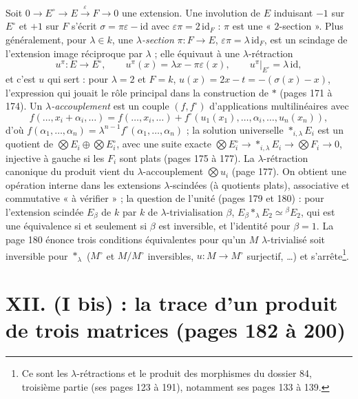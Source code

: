 \documentclass[11pt,a4paper]{article}
\begin{document}
Soit $0 \to E^{\circ} \to E \xrightarrow{\varepsilon} F \to 0$ une extension. Une
involution de $E$ induisant $-1$ sur $E^{\circ}$ et $+1$ sur $F$ s'écrit $\sigma
= \pi\varepsilon - \mathrm{id}$ avec $\varepsilon\pi = 2\,\mathrm{id}_F$ : $\pi$ est
une « $2$-section ». Plus généralement, pour $\lambda \in k$, une
\emph{$\lambda$-section} $\pi : F \to E$, $\varepsilon\pi = \lambda\,\mathrm{id}_F$,
est un scindage de l'extension image réciproque par $\lambda$ ; elle équivaut à
une $\lambda$-rétraction
\[
  u^{\pi} : E \to E^{\circ},\qquad u^{\pi}(x) = \lambda x - \pi\varepsilon(x),
  \qquad u^{\pi}|_{E^{\circ}} = \lambda\,\mathrm{id},
\]
et c'est $u$ qui sert : pour $\lambda = 2$ et $F = k$, $u(x) = 2x - t = -(\sigma(x)
- x)$, l'expression qui jouait le rôle principal dans la construction de $*$
(pages 171 à 174). Un \emph{$\lambda$-accouplement} est un couple $(f, f^{\circ})$
d'applications multilinéaires avec
\[
  f(\ldots, x_i + \alpha_i, \ldots) = f(\ldots, x_i, \ldots) + f^{\circ}(u_1(x_1),
  \ldots, \alpha_i, \ldots, u_n(x_n)),
\]
d'où $f(\alpha_1, \ldots, \alpha_n) = \lambda^{n-1}f^{\circ}(\alpha_1, \ldots,
\alpha_n)$ ; la solution universelle $\mathop{*}_{i, \lambda} E_i$ est un quotient de
$\bigotimes E_i \oplus \bigotimes E_i^{\circ}$, avec une suite exacte
$\bigotimes E_i^{\circ} \to \mathop{*}_{i,\lambda} E_i \to \bigotimes F_i \to 0$,
injective à gauche si les $F_i$ sont plats (pages 175 à 177). La
$\lambda$-rétraction canonique du produit vient du $\lambda$-accouplement $\bigotimes
u_i$ (page 177). On obtient une opération interne dans les extensions
$\lambda$-scindées (à quotients plats), associative et commutative « à
vérifier » ; la question de l'unité (pages 179 et 180) : pour l'extension
scindée $E_\beta$ de $k$ par $k$ de $\lambda$-trivialisation $\beta$, $E_\beta
*_\lambda E_2 \simeq {}^{\beta}E_2$, qui est une équivalence si et seulement si
$\beta$ est inversible, et l'identité pour $\beta = 1$. La page 180 énonce trois
conditions équivalentes pour qu'un $M$ $\lambda$-trivialisé soit inversible pour
$*_\lambda$ ($M^{\circ}$ et $M/M^{\circ}$ inversibles, $u : M \to M^{\circ}$
surjectif, …) et s'arrête\footnote{Ce sont les $\lambda$-rétractions et le produit
des morphismes du dossier 84, troisième partie (ses pages 123 à 191),
notamment ses pages 133 à 139.}.

\section*{XII. (I bis) : la trace d'un produit de trois matrices (pages 182 à 200)}
\end{document}
